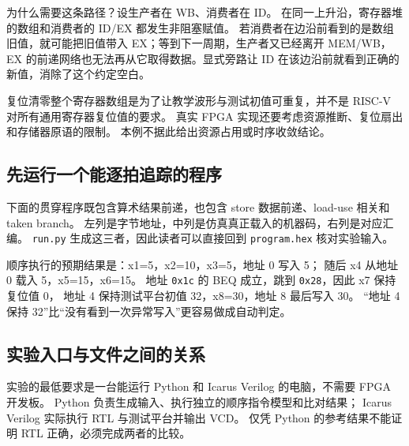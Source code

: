 \par\noindent\begin{minipage}{\linewidth}\vspace{8pt}

\end{minipage}\par

为什么需要这条路径？设生产者在 WB、消费者在 ID。
在同一上升沿，寄存器堆的数组和消费者的 ID/EX 都发生非阻塞赋值。
若消费者在边沿前看到的是数组旧值，就可能把旧值带入 EX；等到下一周期，生产者又已经离开 MEM/WB，
EX 的前递网络也无法再从它取得数据。显式旁路让 ID 在该边沿前就看到正确的新值，消除了这个约定空白。

复位清零整个寄存器数组是为了让教学波形与测试初值可重复，并不是 RISC-V 对所有通用寄存器复位值的要求。
真实 FPGA 实现还要考虑资源推断、复位扇出和存储器原语的限制。
本例不据此给出资源占用或时序收敛结论。

\subsection{先运行一个能逐拍追踪的程序}

下面的贯穿程序既包含算术结果前递，也包含 store 数据前递、load-use 相关和 taken branch。
左列是字节地址，中列是仿真真正载入的机器码，右列是对应汇编。
\texttt{run.py} 生成这三者，因此读者可以直接回到 \texttt{program.hex} 核对实验输入。

\par\noindent\begin{minipage}{\linewidth}\vspace{8pt}

\end{minipage}\par

顺序执行的预期结果是：x1=5，x2=10，x3=5，地址 0 写入 5；
随后 x4 从地址 0 载入 5，x5=15，x6=15。
地址 \texttt{0x1c} 的 BEQ 成立，跳到 \texttt{0x28}，因此 x7 保持复位值 0，
地址 4 保持测试平台初值 32，x8=30，地址 8 最后写入 30。
“地址 4 保持 32”比“没有看到一次异常写入”更容易做成自动判定。

\subsection{实验入口与文件之间的关系}

实验的最低要求是一台能运行 Python 和 Icarus Verilog 的电脑，不需要 FPGA 开发板。
Python 负责生成输入、执行独立的顺序指令模型和比对结果；
Icarus Verilog 实际执行 RTL 与测试平台并输出 VCD\cite{ch4-iverilog}。
仅凭 Python 的参考结果不能证明 RTL 正确，必须完成两者的比较。

